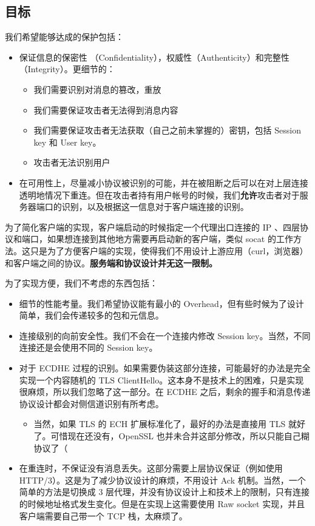 \documentclass{ctexart}
\begin{document}
  \subsection{目标}

  我们希望能够达成的保护包括：

  \begin{itemize}
    \item 保证信息的保密性 （Confidentiality），权威性（Authenticity）和完整性（Integrity）。更细节的：
    \begin{itemize}
      \item 我们需要识别对消息的篡改，重放
      \item 我们需要保证攻击者无法得到消息内容
      \item 我们需要保证攻击者无法获取（自己之前未掌握的）密钥，包括 Session key 和 User key。
      \item 攻击者无法识别用户
    \end{itemize}
    \item 在可用性上，尽量减小协议被识别的可能，并在被阻断之后可以在对上层连接透明地情况下重连。但在攻击者持有用户帐号的时候，我们\textbf{允许}攻击者对于服务器端口的识别，以及根据这一信息对于客户端连接的识别。
  \end{itemize}

  为了简化客户端的实现，客户端启动的时候指定一个代理出口连接的 IP 、四层协议和端口，如果想连接到其他地方需要再启动新的客户端，类似 socat 的工作方法。这只是为了方便客户端的实现，使得我们不用设计上游应用（curl，浏览器）和客户端之间的协议。\textbf{服务端和协议设计并无这一限制。}

  \vspace*{1em}

  为了实现方便，我们不考虑的东西包括：

  \begin{itemize}
    \item 细节的性能考量。我们希望协议能有最小的 Overhead，但有些时候为了设计简单，我们会传递较多的包和元信息。
    \item 连接级别的向前安全性。我们不会在一个连接内修改 Session key。当然，不同连接还是会使用不同的 Session key。
    \item 对于 ECDHE 过程的识别。如果需要伪装这部分连接，可能最好的办法是完全实现一个内容随机的 TLS ClientHello。这本身不是技术上的困难，只是实现很麻烦，所以我们忽略了这一部分。在 ECDHE 之后，剩余的握手和消息传递协议设计都会对侧信道识别有所考虑。
    \begin{itemize}
      \item 当然，如果 TLS 的 ECH 扩展标准化了，最好的办法是直接用 TLS 就好了。可惜现在还没有，OpenSSL 也并未合并这部分修改，所以只能自己糊协议了（
    \end{itemize}
    \item 在重连时，不保证没有消息丢失。这部分需要上层协议保证（例如使用 HTTP/3）。这是为了减少协议设计的麻烦，不用设计 Ack 机制。当然，一个简单的方法是切换成 3 层代理，并没有协议设计上和技术上的限制，只有连接的时候地址格式发生变化。但是在实现上这需要使用 Raw socket 实现，并且客户端需要自己带一个 TCP 栈，太麻烦了。
  \end{itemize}
\end{document}
